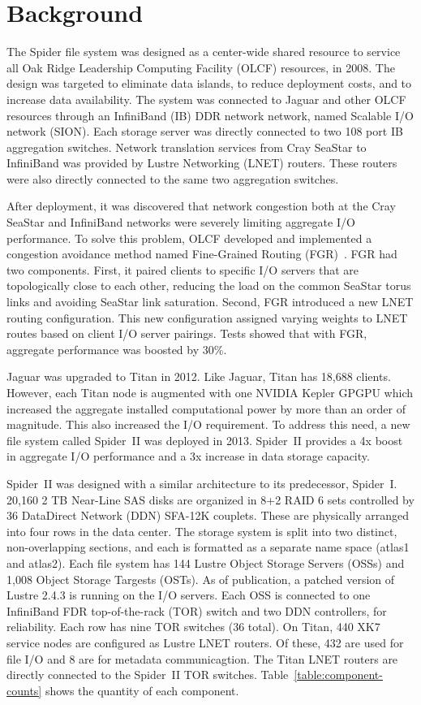 \section{Background}

The Spider file system was designed as a center-wide shared resource to service
all Oak Ridge Leadership Computing Facility (OLCF) resources, in 2008. The
design was targeted to eliminate data islands, to reduce deployment costs, and
to increase data availability. The system was connected to Jaguar and other
OLCF resources through an InfiniBand (IB) DDR network network, named Scalable
I/O network (SION).  Each storage server was directly connected to two 108 port
IB aggregation switches.  Network translation services from Cray SeaStar to
InfiniBand was provided by Lustre Networking (LNET) routers. These routers were
also directly connected to the same two aggregation switches.    

After deployment, it was discovered that network congestion both at the Cray
SeaStar and InfiniBand networks were severely limiting aggregate I/O
performance. To solve this problem, OLCF developed and implemented a congestion
avoidance method named Fine-Grained Routing (FGR)~\cite{dillow-fgr}. FGR had
two components.  First, it paired clients to specific I/O servers that are
topologically close to each other, reducing the load on the common SeaStar
torus links and avoiding SeaStar link saturation. Second, FGR introduced a new
LNET routing configuration. This new configuration assigned varying weights to
LNET routes based on client I/O server pairings. Tests showed that with
FGR, aggregate performance was boosted by 30\%.   
 
Jaguar was upgraded to Titan in 2012. Like Jaguar, Titan has 18,688 clients.
However, each Titan node is augmented with one NVIDIA Kepler GPGPU
which increased the aggregate installed computational power by more than an
order of magnitude.  This also increased the I/O requirement. To address this
need, a new file system called Spider~II was deployed in 2013. Spider~II
provides a 4x boost in aggregate I/O performance and a 3x increase in data
storage capacity.

Spider~II was designed with a similar architecture to its predecessor,
Spider~I.  20,160 2 TB Near-Line SAS disks are organized in 8+2 RAID 6 sets
controlled by 36 DataDirect Network (DDN) SFA-12K couplets. These are
physically arranged into four rows in the data center.  The storage system is
split into two distinct, non-overlapping sections, and each is formatted as a
separate name space (atlas1 and atlas2). Each file system has 144 Lustre Object
Storage Servers (OSSs) and 1,008 Object Storage Targests (OSTs). As of
publication, a patched version of Lustre 2.4.3 is running on the I/O servers.
Each OSS is connected to one InfiniBand FDR top-of-the-rack (TOR) switch and
two DDN controllers, for reliability.  Each row has nine TOR switches (36
total).  On Titan, 440 XK7 service nodes are configured as Lustre LNET routers.
Of these, 432 are used for file I/O and 8 are for metadata communicagtion. 
The Titan LNET routers are directly connected to the Spider~II TOR
switches.  Table~\ref{table:component-counts} shows the quantity of each
component.

